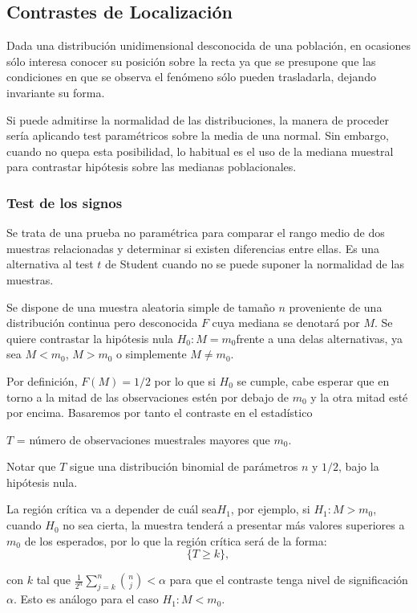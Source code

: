 \documentclass[a4paper,12pt]{article}
\begin{document}
\subsection{Contrastes de Localización}
Dada una distribución unidimensional desconocida de una población, en ocasiones sólo interesa conocer su posición sobre la recta ya que se presupone que las condiciones en que se observa el fenómeno sólo pueden trasladarla, dejando invariante su forma.

Si puede admitirse la normalidad de las distribuciones, la manera de proceder sería aplicando test paramétricos sobre la media de una normal. Sin embargo, cuando no quepa esta posibilidad, lo habitual es el uso de la mediana muestral para contrastar hipótesis sobre las medianas poblacionales.

\subsubsection{Test de los signos}
Se trata de una prueba no paramétrica para comparar el rango medio de dos muestras relacionadas y determinar si existen diferencias entre ellas. Es una alternativa al test $t$ de Student cuando no se puede suponer la normalidad de las muestras.

Se dispone de una muestra aleatoria simple de tamaño $n$ proveniente de una distribución continua pero desconocida $F$ cuya mediana se denotará por $M$. Se quiere contrastar la hipótesis nula $H_0: M=m_0$frente a una delas alternativas, ya sea $M<m_0$, $M>m_0$ o simplemente $M\neq m_0$.

Por definición, $F(M)=1/2$ por lo que si $H_0$ se cumple, cabe esperar que en torno a la mitad de las observaciones estén por debajo de $m_0$ y la otra mitad esté por encima. Basaremos por tanto el contraste en el estadístico

\begin{center}
$T$ = número de observaciones muestrales mayores que $m_0$.
\end{center}

Notar que $T$ sigue una distribución binomial de parámetros $n$ y $1/2$, bajo la hipótesis nula.

La región crítica va a depender de cuál sea$H_1$, por ejemplo, si $H_1:M>m_0$, cuando $H_0$ no sea cierta, la muestra tenderá a presentar más valores superiores a $m_0$ de los esperados, por lo que la región crítica será de la forma:
$$\{T\geq k \},$$

con $k$ tal que $\frac{1}{2^n}\sum_{j=k}^{n} \binom{n}{j} < \alpha$ para que el contraste tenga nivel de significación $\alpha$. Esto es análogo para el caso $H_1: M< m_0$.
\end{document}
